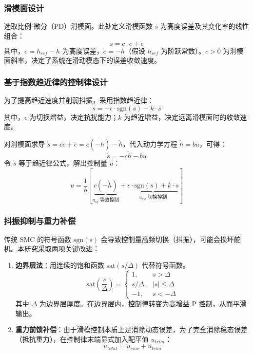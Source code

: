 \documentclass[UTF8, a4paper, 12pt]{ctexart}
\begin{document}
\subsubsection{滑模面设计}
选取比例-微分（PD）滑模面。此处定义滑模函数 $s$ 为高度误差及其变化率的线性组合：
\begin{equation}
    s = c \cdot e + \dot{e}
\end{equation}
其中，$e = h_{ref} - h$ 为高度误差，$\dot{e} = -\dot{h}$（假设 $h_{ref}$ 为阶跃常数）。$c > 0$ 为滑模面斜率，决定了系统在滑动模态下的误差收敛速度。

\subsubsection{基于指数趋近律的控制律设计}
为了提高趋近速度并削弱抖振，采用指数趋近律：
\begin{equation}
    \dot{s} = -\epsilon \cdot \text{sgn}(s) - k \cdot s
\end{equation}
其中，$\epsilon$ 为切换增益，决定抗扰能力；$k$ 为趋近增益，决定远离滑模面时的收敛速度。

对滑模面求导 $\dot{s} = c\dot{e} + \ddot{e} = c(-\dot{h}) - \ddot{h}$，代入动力学方程 $\ddot{h} = b u$，可得：
\begin{equation}
    \dot{s} = -c \dot{h} - b u
\end{equation}
令 $\dot{s}$ 等于趋近律公式，解出控制量 $u$：
\begin{equation}
    u = \frac{1}{b} \left[ \underbrace{c(-\dot{h})}_{u_{eq} \text{ 等效控制}} + \underbrace{\epsilon \cdot \text{sgn}(s) + k \cdot s}_{u_{sw} \text{ 切换控制}} \right]
\end{equation}

\subsubsection{抖振抑制与重力补偿}
传统 SMC 的符号函数 $\text{sgn}(s)$ 会导致控制量高频切换（抖振），可能会损坏舵机。本研究采取两项关键改进：
\begin{enumerate}
    \item \textbf{边界层法}：用连续的饱和函数 $\text{sat}(s/\Delta)$ 代替符号函数。
    \begin{equation}
        \text{sat}\left(\frac{s}{\Delta}\right) = \begin{cases} 
        1, & s > \Delta \\
        s/\Delta, & |s| \le \Delta \\
        -1, & s < -\Delta 
        \end{cases}
    \end{equation}
    其中 $\Delta$ 为边界层厚度。在边界层内，控制律转变为高增益 P 控制，从而平滑输出。
    
    \item \textbf{重力前馈补偿}：由于滑模控制本质上是消除动态误差，为了完全消除稳态误差（抵抗重力），在控制律末端显式加入配平值 $u_{trim}$：
    \begin{equation}
        u_{total} = u_{smc} + u_{trim}
    \end{equation}
\end{enumerate}
\end{document}
